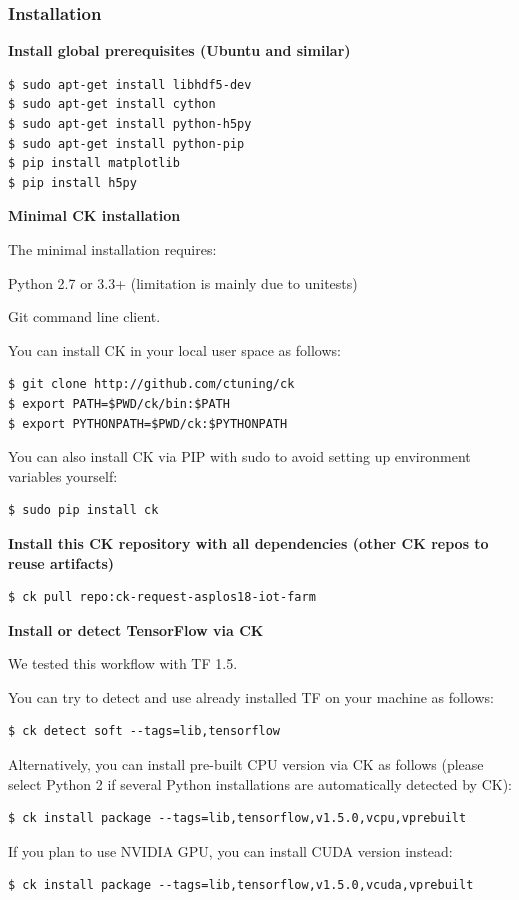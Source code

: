 \documentclass[sigplan]{acmart}
\newenvironment{packed_itemize}{
\begin{itemize}
  \setlength{\itemsep}{1pt}
  \setlength{\parskip}{0pt}
  \setlength{\parsep}{0pt}
}{\end{itemize}}
\begin{document}
\subsubsection{Installation}

\textbf{Install global prerequisites (Ubuntu and similar)}

\begin{verbatim}
$ sudo apt-get install libhdf5-dev
$ sudo apt-get install cython
$ sudo apt-get install python-h5py
$ sudo apt-get install python-pip
$ pip install matplotlib
$ pip install h5py
\end{verbatim}

\textbf{Minimal CK installation}

The minimal installation requires:

\begin{packed_itemize}
 \item Python 2.7 or 3.3+ (limitation is mainly due to unitests)
 \item Git command line client.
\end{packed_itemize}

You can install CK in your local user space as follows:

\begin{verbatim}
$ git clone http://github.com/ctuning/ck
$ export PATH=$PWD/ck/bin:$PATH
$ export PYTHONPATH=$PWD/ck:$PYTHONPATH
\end{verbatim}

You can also install CK via PIP with sudo to avoid setting up environment variables yourself:

\begin{verbatim}
$ sudo pip install ck
\end{verbatim}

\textbf{Install this CK repository with all dependencies (other CK repos to reuse artifacts)}
\begin{verbatim}$ ck pull repo:ck-request-asplos18-iot-farm\end{verbatim}

\textbf{Install or detect TensorFlow via CK}

We tested this workflow with TF 1.5. 

You can try to detect and use already installed TF on your machine as follows:
\begin{verbatim}
$ ck detect soft --tags=lib,tensorflow
\end{verbatim}

Alternatively, you can install pre-built CPU version via CK as follows
(please select Python 2 if several Python installations are automatically detected by CK):
\begin{verbatim}
$ ck install package --tags=lib,tensorflow,v1.5.0,vcpu,vprebuilt
\end{verbatim}
If you plan to use NVIDIA GPU, you can install CUDA version instead:
\begin{verbatim}
$ ck install package --tags=lib,tensorflow,v1.5.0,vcuda,vprebuilt
\end{verbatim}
\end{document}
